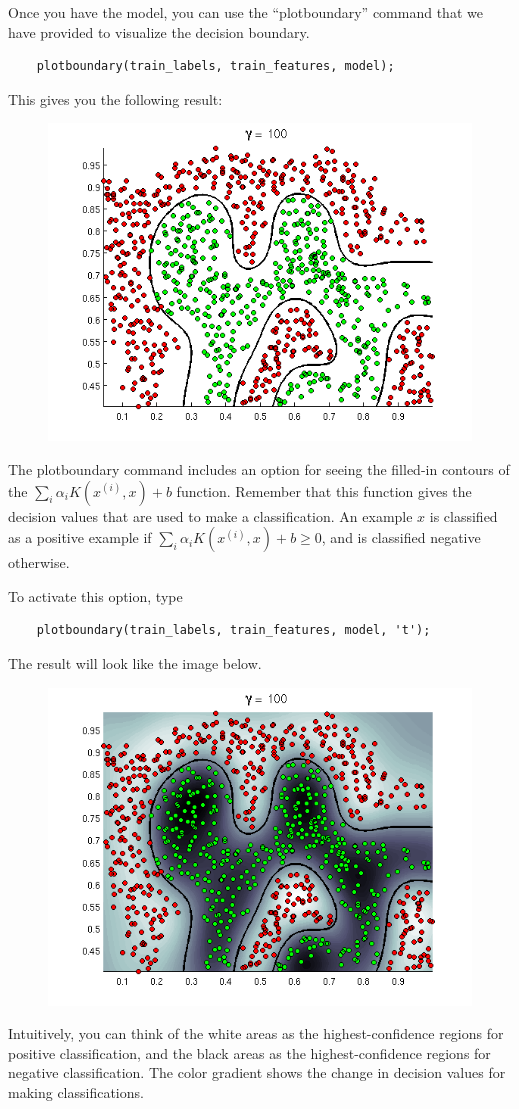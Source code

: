 \documentclass[10pt,a4paper]{article}
\begin{document}
  Once you have the model, you can use the ``plotboundary'' command that we have provided to visualize the decision boundary.
  \begin{lstlisting}
    plotboundary(train_labels, train_features, model);
  \end{lstlisting}
  This gives you the following result:
  \begin{figure}[htb!]
    \centering
      \includegraphics[width=.7\columnwidth]{ex8a_nofill}
  \end{figure}
  The plotboundary command includes an option for seeing the filled-in contours of the  $\sum_i \alpha_i K(x^{(i)}, x) + b$ function. Remember that this function gives the decision values that are used to make a classification. An example  $x$ is classified as a positive example if  $\sum_i \alpha_i K(x^{(i)}, x) + b \geq 0$, and is classified negative otherwise.

  To activate this option, type
  \begin{lstlisting}
    plotboundary(train_labels, train_features, model, 't');
  \end{lstlisting}
  The result will look like the image below.
  \begin{figure}[htb!]
    \centering
      \includegraphics[width=.7\columnwidth]{ex8a_fill}
  \end{figure}
  Intuitively, you can think of the white areas as the highest-confidence regions for positive classification, and the black areas as the highest-confidence regions for negative classification. The color gradient shows the change in decision values for making classifications.
\end{document}

